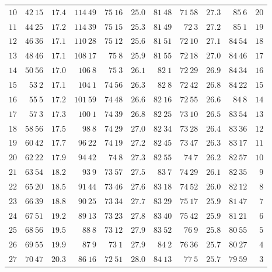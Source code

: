\begin{center}
\begin{tabular}{r|r|r|r|r|r|r|r|r|r|r}
$10$ & $42\ 15$ & $17.4$ & $114\ 49$ & $75\ 16$ & $25.0$ & $81\ 48$ & $71\ 58$ & $27.3$ & $85\ 6$ & $20$ \\[3pt]
$11$ & $44\ 25$ & $17.2$ & $114\ 39$ & $75\ 15$ & $25.3$ & $81\ 49$ & $72\ 3$ & $27.2$ & $85\ 1$ & $19$ \\
$12$ & $46\ 36$ & $17.1$ & $110\ 28$ & $75\ 12$ & $25.6$ & $81\ 51$ & $72\ 10$ & $27.1$ & $84\ 54$ & $18$ \\
$13$ & $48\ 46$ & $17.1$ & $108\ 17$ & $75\ 8$ & $25.9$ & $81\ 55$ & $72\ 18$ & $27.0$ & $84\ 46$ & $17$ \\
$14$ & $50\ 56$ & $17.0$ & $106\ 8$ & $75\ 3$ & $26.1$ & $82\ 1$ & $72\ 29$ & $26.9$ & $84\ 34$ & $16$ \\
$15$ & $53\ 2$ & $17.1$ & $104\ 1$ & $74\ 56$ & $26.3$ & $82\ 8$ & $72\ 42$ & $26.8$ & $84\ 22$ & $15$ \\[3pt]
$16$ & $55\ 5$ & $17.2$ & $101\ 59$ & $74\ 48$ & $26.6$ & $82\ 16$ & $72\ 55$ & $26.6$ & $84\ 8$ & $14$ \\
$17$ & $57\ 3$ & $17.3$ & $100\ 1$ & $74\ 39$ & $26.8$ & $82\ 25$ & $73\ 10$ & $26.5$ & $83\ 54$ & $13$ \\
$18$ & $58\ 56$ & $17.5$ & $98\ 8$ & $74\ 29$ & $27.0$ & $82\ 34$ & $73\ 28$ & $26.4$ & $83\ 36$ & $12$ \\
$19$ & $60\ 42$ & $17.7$ & $96\ 22$ & $74\ 19$ & $27.2$ & $82\ 45$ & $73\ 47$ & $26.3$ & $83\ 17$ & $11$ \\
$20$ & $62\ 22$ & $17.9$ & $94\ 42$ & $74\ 8$ & $27.3$ & $82\ 55$ & $74\ 7$ & $26.2$ & $82\ 57$ & $10$ \\[3pt]
$21$ & $63\ 54$ & $18.2$ & $93\ 9$ & $73\ 57$ & $27.5$ & $83\ 7$ & $74\ 29$ & $26.1$ & $82\ 35$ & $9$ \\
$22$ & $65\ 20$ & $18.5$ & $91\ 44$ & $73\ 46$ & $27.6$ & $83\ 18$ & $74\ 52$ & $26.0$ & $82\ 12$ & $8$ \\
$23$ & $66\ 39$ & $18.8$ & $90\ 25$ & $73\ 34$ & $27.7$ & $83\ 29$ & $75\ 17$ & $25.9$ & $81\ 47$ & $7$ \\
$24$ & $67\ 51$ & $19.2$ & $89\ 13$ & $73\ 23$ & $27.8$ & $83\ 40$ & $75\ 42$ & $25.9$ & $81\ 21$ & $6$ \\
$25$ & $68\ 56$ & $19.5$ & $88\ 8$ & $73\ 12$ & $27.9$ & $83\ 52$ & $76\ 9$ & $25.8$ & $80\ 55$ & $5$ \\[3pt]
$26$ & $69\ 55$ & $19.9$ & $87\ 9$ & $73\ 1$ & $27.9$ & $84\ 2$ & $76\ 36$ & $25.7$ & $80\ 27$ & $4$ \\
$27$ & $70\ 47$ & $20.3$ & $86\ 16$ & $72\ 51$ & $28.0$ & $84\ 13$ & $77\ 5$ & $25.7$ & $79\ 59$ & $3$ \\

\end{tabular}
\end{center}
